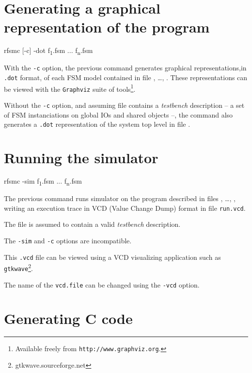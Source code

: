 \clearpage
\section{Generating a graphical representation of the program}
\label{sec:gener-graph-repr}

\begin{FVerbatim}[commandchars=\\\{\}]
rfsmc [-c] -dot f\textsubscript{1}.fsm ... f\textsubscript{n}.fsm
\end{FVerbatim}

With the \verb|-c| option, the previous command generates graphical representations,in \verb|.dot| format, of each FSM model
contained in file , \ldots, . These representations can be viewed
with the \texttt{Graphviz} suite of tools\footnote{Available freely from
  \texttt{http://www.graphviz.org}.}.

Without the \verb|-c| option, and assuming file  contains a \emph{testbench}
description -- \ie a set of FSM instanciations on global IOs and shared objects --, the 
command also generates a \verb|.dot| representation of the system top level in file
.

\section{Running the simulator}
\label{sec:running-simulator}

\begin{FVerbatim}[commandchars=\\\{\}]
rfsmc -sim f\textsubscript{1}.fsm ... f\textsubscript{n}.fsm
\end{FVerbatim}

The previous command runs simulator on the program described in files , \ldots,
, writing
an execution trace in VCD (Value Change Dump) format in file \verb|run.vcd|.

The file  is assumed to contain a valid \emph{testbench} description.

The \verb|-sim| and \verb|-c| options are incompatible.

This \verb|.vcd| file can be viewed using a VCD visualizing application such as
\verb|gtkwave|\footnote{gtkwave.sourceforge.net}.

The name of the \verb|vcd.file| can be changed using the \verb|-vcd| option.

\section{Generating C code}
\label{sec:gener-c-code}

